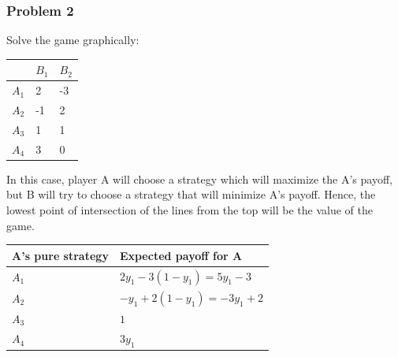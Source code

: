 \documentclass[12pt]{article}
\begin{document}
\subsubsection*{Problem 2}
Solve the game graphically:

\begin{center}
  \begin{tabular}{|l|l|l|}
    \hline
    & $B_1$ & $B_2$ \\
    \hline
    $A_1$ & 2     & -3    \\
    $A_2$ & -1    & 2     \\
    $A_3$ & 1     & 1     \\
    $A_4$ & 3     & 0     \\
    \hline 
  \end{tabular}
\end{center}


In this case, player A will choose a strategy which will maximize the A's payoff, but B will try to choose a strategy that will minimize A's payoff. Hence, the lowest point of intersection of the lines from the top will be the value of the game.

\begin{center}
  \begin{tabular}{|l|l|}
    \hline
    \textbf{A's pure strategy} & \textbf{Expected payoff for A}       \\
    \hline
    $A_1$                      & $2y_1-3\left(1-y_1\right)=5y_1-3$    \\
    $A_2$                      & $-y_1+2\left(1-y_1\right) = -3y_1+2$ \\
    $A_3$                      & $1$                                  \\
    $A_4$                      & $3 y_1$                              \\
    \hline
  \end{tabular}
\end{center}
\end{document}
